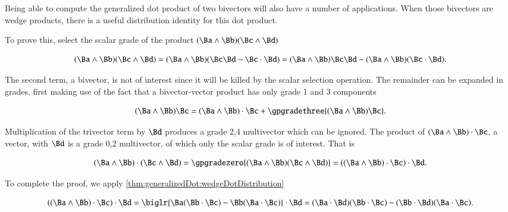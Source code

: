 

Being able to compute the generalized dot product of two bivectors will also have a number of applications.
When those bivectors are wedge products, there is a useful distribution identity for this dot product.


To prove this, select the scalar grade of the product \( (\Ba \wedge \Bb) (\Bc \wedge \Bd) \)

\begin{dmath}\label{eqn:generalizedDot_bivectorDot:1160}
(\Ba \wedge \Bb) (\Bc \wedge \Bd)
=
(\Ba \wedge \Bb) (\Bc \Bd - \Bc \cdot \Bd)
=
(\Ba \wedge \Bb) \Bc \Bd -
(\Ba \wedge \Bb) (\Bc \cdot \Bd).
\end{dmath}

The second term, a bivector, is not of interest since it will be killed by the scalar selection operation.
The remainder can be expanded in grades, first making use of the fact that a bivector-vector product has only
grade 1 and 3 components

\begin{dmath}\label{eqn:generalizedDot_bivectorDot:1180}
(\Ba \wedge \Bb) \Bc
=
(\Ba \wedge \Bb) \cdot \Bc
+ \gpgradethree{ (\Ba \wedge \Bb) \Bc }.
\end{dmath}

Multiplication of the trivector term by \( \Bd \) produces a grade 2,4 multivector which can be ignored.
The product
of \( (\Ba \wedge \Bb) \cdot \Bc \), a vector, with \( \Bd \) is a grade 0,2 multivector, of which only the scalar grade is of interest.
That is

\begin{dmath}\label{eqn:generalizedDot_bivectorDot:1220}
(\Ba \wedge \Bb) \cdot (\Bc \wedge \Bd)
= \gpgradezero{ (\Ba \wedge \Bb) (\Bc \wedge \Bd) }
=
((\Ba \wedge \Bb) \cdot \Bc )\cdot \Bd.
\end{dmath}

To complete the proof, we apply \cref{thm:generalizedDot:wedgeDotDistribution}

\begin{dmath}\label{eqn:generalizedDot_bivectorDot:1240}
((\Ba \wedge \Bb) \cdot \Bc )\cdot \Bd
=
\biglr{ \Ba (\Bb \cdot \Bc) - \Bb (\Ba \cdot \Bc) } \cdot \Bd
=
(\Ba \cdot \Bd) (\Bb \cdot \Bc) - (\Bb \cdot \Bd) (\Ba \cdot \Bc).
\end{dmath}

